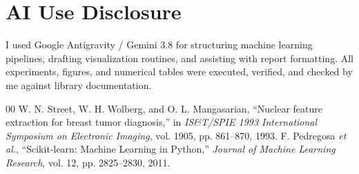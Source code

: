 \documentclass[conference,10pt]{IEEEtran}
\begin{document}
\section*{AI Use Disclosure}
I used Google Antigravity / Gemini 3.8 for structuring machine learning pipelines, drafting visualization routines, and assisting with report formatting. All experiments, figures, and numerical tables were executed, verified, and checked by me against library documentation.

\begin{thebibliography}{00}
 W. N. Street, W. H. Wolberg, and O. L. Mangasarian, ``Nuclear feature extraction for breast tumor diagnosis,'' in \textit{IS\&T/SPIE 1993 International Symposium on Electronic Imaging}, vol. 1905, pp. 861--870, 1993.
 F. Pedregosa \textit{et al.}, ``Scikit-learn: Machine Learning in Python,'' \textit{Journal of Machine Learning Research}, vol. 12, pp. 2825--2830, 2011.
\end{thebibliography}
\end{document}
